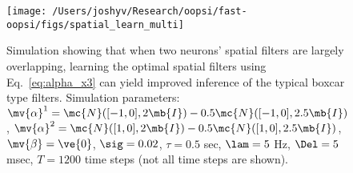 


\begin{figure}[h!]
\centering \texttt{[image: /Users/joshyv/Research/oopsi/fast-oopsi/figs/spatial\_learn\_multi]}
\caption[overlapping spatial filters can be estimated]{Simulation showing that when two neurons' spatial filters are largely overlapping, learning the optimal spatial filters using Eq.~\ref{eq:alpha_x3} can yield improved inference of the typical boxcar type filters.  Simulation parameters: $\mv{\alpha}^1=\mc{N}([-1, 0],2 \mb{I})-0.5 \mc{N}([-1, 0],2.5 \mb{I})$, $\mv{\alpha}^2=\mc{N}([1, 0],2 \mb{I})-0.5 \mc{N}([1, 0],2.5 \mb{I})$, $\mv{\beta}=\ve{0}$,  $\sig=0.02$, $\tau=0.5$ sec, $\lam=5$ Hz, $\Del=5$ msec, $T=1200$ time steps (not all time steps are shown).} \label{fig:spatial_multi_learn}
\end{figure}









